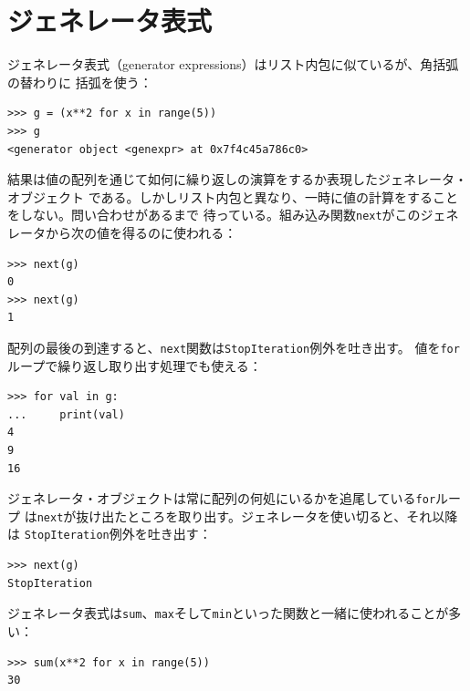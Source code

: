 \documentclass[a4j,12pt,makeidx]{jbook}
\begin{document}
\section{ジェネレータ表式}
ジェネレータ表式（generator expressions）はリスト内包に似ているが、角括弧の替わりに
括弧を使う：
\begin{verbatim}
>>> g = (x**2 for x in range(5))
>>> g
<generator object <genexpr> at 0x7f4c45a786c0>
\end{verbatim}
結果は値の配列を通じて如何に繰り返しの演算をするか表現したジェネレータ・オブジェクト
である。しかしリスト内包と異なり、一時に値の計算をすることをしない。問い合わせがあるまで
待っている。組み込み関数{\tt next}がこのジェネレータから次の値を得るのに使われる：
\begin{verbatim}
>>> next(g)
0
>>> next(g)
1
\end{verbatim}
配列の最後の到達すると、{\tt next}関数は{\tt StopIteration}例外を吐き出す。
値を{\tt for}ループで繰り返し取り出す処理でも使える：
\begin{verbatim}
>>> for val in g:
...     print(val)
4
9
16
\end{verbatim}
ジェネレータ・オブジェクトは常に配列の何処にいるかを追尾している{\tt for}ループ
は{\tt next}が抜け出たところを取り出す。ジェネレータを使い切ると、それ以降は
{\tt StopIteration}例外を吐き出す：
\begin{verbatim}
>>> next(g)
StopIteration
\end{verbatim}
ジェネレータ表式は{\tt sum}、{\tt max}そして{\tt min}といった関数と一緒に使われることが多い：
\begin{verbatim}
>>> sum(x**2 for x in range(5))
30
\end{verbatim}
%
\end{document}
